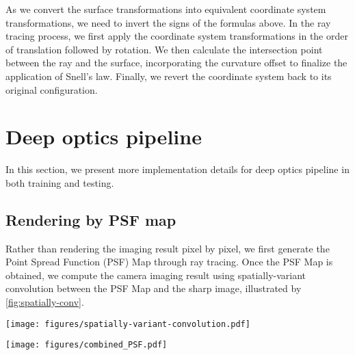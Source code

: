 As we convert the surface transformations into equivalent coordinate system transformations, we need to invert the signs of the formulas above. In the ray tracing process, we first apply the coordinate system transformations in the order of translation followed by rotation. We then calculate the intersection point between the ray and the surface, incorporating the curvature offset to finalize the application of Snell's law. Finally, we revert the coordinate system back to its original configuration.

\section{Deep optics pipeline}
In this section, we present more implementation details for deep optics pipeline in both training and testing.

\subsection{Rendering by PSF map}
Rather than rendering the imaging result pixel by pixel, we first generate the Point Spread Function (PSF) Map through ray tracing. Once the PSF Map is obtained, we compute the camera imaging result using spatially-variant convolution between the PSF Map and the sharp image, illustrated by \cref{fig:spatially-conv}.

\begin{figure*}[tb] \centering
  \texttt{[image: figures/spatially-variant-convolution.pdf]}
  \caption{Initially, the original image is populated with reflections. Subsequently, images at various field-of-view positions within the complete large image are convolved using the point spread function (PSF) corresponding to each field-of-view as the convolution kernel. Finally, the convolved images are integrated to produce a cohesive composite.} 
  \label{fig:spatially-conv}
\end{figure*}

\begin{figure*}[tb] \centering
  \texttt{[image: figures/combined\_PSF.pdf]}
  \caption{For each local field of view (FoV), a random tolerance pattern is sampled, and the local Point Spread Function (PSF) is obtained through differentiable ray tracing. These local PSFs are then stitched together to create a PSF map that incorporates multiple tolerance patterns.} 
  \label{fig:combine_PSF}
\end{figure*}


